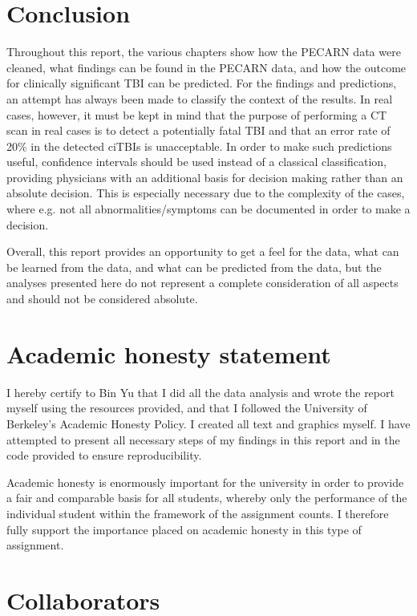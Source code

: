 \documentclass[10pt,letterpaper]{article}
\begin{document}
\section{Conclusion}\label{conclusion}

Throughout this report, the various chapters show how the PECARN data were cleaned, what findings can be found in the PECARN data, and how the outcome for clinically significant TBI can be predicted. For the findings and predictions, an attempt has always been made to classify the context of the results. In real cases, however, it must be kept in mind that the purpose of performing a CT scan in real cases is to detect a potentially fatal TBI and that an error rate of 20\% in the detected ciTBIs is unacceptable. In order to make such predictions useful, confidence intervals should be used instead of a classical classification, providing physicians with an additional basis for decision making rather than an absolute decision. This is especially necessary due to the complexity of the cases, where e.g. not all abnormalities/symptoms can be documented in order to make a decision.

Overall, this report provides an opportunity to get a feel for the data, what can be learned from the data, and what can be predicted from the data, but the analyses presented here do not represent a complete consideration of all aspects and should not be considered absolute.

\section{Academic honesty statement}\label{academic-honesty-statement}

I hereby certify to Bin Yu that I did all the data analysis and wrote the report myself using the resources provided, and that I followed the University of Berkeley's Academic Honesty Policy. I created all text and graphics myself. I have attempted to present all necessary steps of my findings in this report and in the code provided to ensure reproducibility.

Academic honesty is enormously important for the university in order to provide a fair and comparable basis for all students, whereby only the performance of the individual student within the framework of the assignment counts. I therefore fully support the importance placed on academic honesty in this type of assignment.

\section{Collaborators}\label{collaborators}
\end{document}
